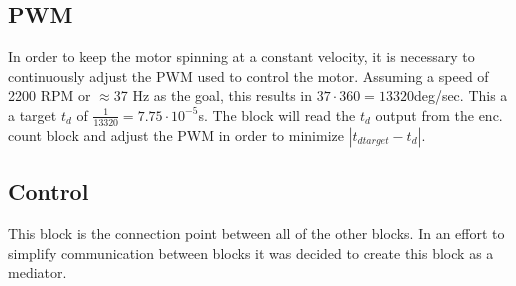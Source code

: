 \subsection{PWM}
In order to keep the motor spinning at a constant velocity, it is necessary to continuously adjust the PWM used to control the motor.
Assuming a speed of 2200 RPM or $\approx$37 Hz as the goal, this results in $37\cdot360=13320$deg/sec.
This a a target $t_d$ of $\frac{1}{13320}=7.75\cdot10^{-5}$s.
The block will read the $t_d$ output from the enc. count block and adjust the PWM in order to minimize $|t_{d target}-t_d|$.

\subsection{Control}
This block is the connection point between all of the other blocks.
In an effort to simplify communication between blocks it was decided to create this block as a mediator.